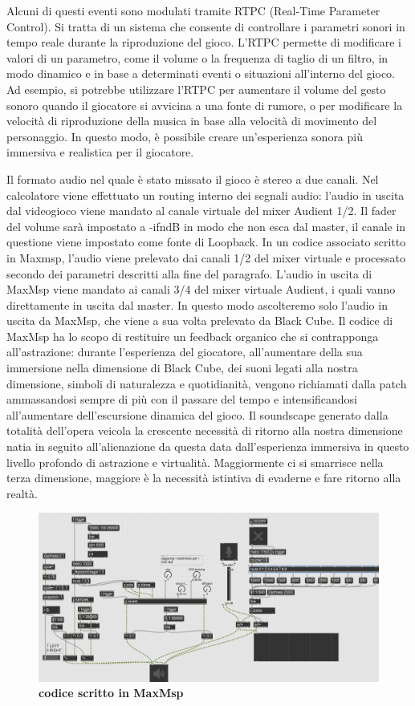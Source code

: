 	Alcuni di questi eventi sono modulati tramite RTPC (Real-Time Parameter Control). Si tratta di un sistema che consente di controllare i parametri sonori in tempo reale durante la riproduzione del gioco. 
	L'RTPC permette di modificare i valori di un parametro, come il volume o la frequenza di taglio di un filtro, in modo dinamico e in base a determinati eventi o situazioni all'interno del gioco. Ad esempio, si potrebbe utilizzare l'RTPC per aumentare il volume del gesto sonoro quando il giocatore si avvicina a una fonte di rumore, o per modificare la velocità di riproduzione della musica in base alla velocità di movimento del personaggio. In questo modo, è possibile creare un'esperienza sonora più immersiva e realistica per il giocatore.
	
	Il formato audio nel quale è stato missato il gioco è stereo a due canali. Nel calcolatore viene effettuato un routing interno dei segnali audio: l'audio in uscita dal videogioco viene mandato al canale virtuale del mixer Audient 1/2. Il fader del volume sarà impostato a -ifndB in modo che non esca dal master, il canale in questione viene impostato come fonte di Loopback. In un codice associato scritto in Maxmsp, l'audio viene prelevato dai canali 1/2 del mixer virtuale e processato secondo dei parametri descritti alla fine del paragrafo. L'audio in uscita di MaxMsp viene mandato ai canali 3/4 del mixer virtuale Audient, i quali vanno direttamente in uscita dal master. In questo modo ascolteremo solo l'audio in uscita da MaxMsp, che viene a sua volta prelevato da Black Cube.
	Il codice di MaxMsp ha lo scopo di restituire un feedback organico che si contrapponga all'astrazione: durante l'esperienza del giocatore, all'aumentare della sua immersione nella dimensione di Black Cube, dei suoni legati alla nostra dimensione, simboli di naturalezza e quotidianità, vengono richiamati dalla patch ammassandosi sempre di più con il passare del tempo e intensificandosi all'aumentare dell'escursione dinamica del gioco.
	Il soundscape generato dalla totalità dell'opera veicola la crescente necessità di ritorno alla nostra dimensione natia in seguito all'alienazione da questa data dall'esperienza immersiva in questo livello profondo di astrazione e virtualità. Maggiormente ci si smarrisce nella terza dimensione, maggiore è la necessità istintiva di evaderne e fare ritorno alla realtà.
	
	\begin{figure}[h]
		\begin{center}
			\includegraphics[width=12cm]{img/image8.jpg}
			\caption{\textbf{codice scritto in MaxMsp}}
			\label{gr01}
		\end{center}
	\end{figure}
	
